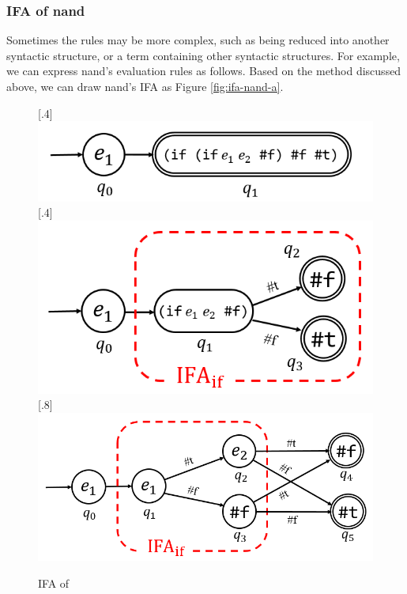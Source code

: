 \subsubsection{IFA of nand}

Sometimes the rules may be more complex, such as being reduced into another syntactic structure, or a term containing other syntactic structures. For example, we can express nand's evaluation rules as follows. Based on the method discussed above, we can draw nand's IFA as Figure \ref{fig:ifa-nand-a}.



\begin{figure}[thbp]
\centering
{}[.4\linewidth]{
    \includegraphics[scale=0.25]{images/ifa-nand-1.png}
}
[.4\linewidth]{
    \includegraphics[scale=0.25]{images/ifa-nand-2.png}
}
[.8\linewidth]{
    \includegraphics[scale=0.25]{images/ifa-nand-3.png}
}
\caption{IFA of }
\label{fig:ifa-nand}
\end{figure}

